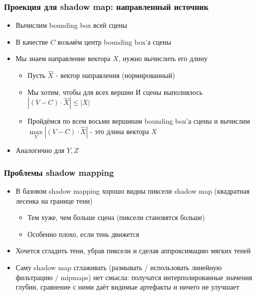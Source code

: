 \documentclass{beamer}
\begin{document}
\begin{frame}[fragile]
\frametitle{Проекция для shadow map: направленный источник}
\begin{itemize}
\item Вычислим bounding box всей сцены
\pause
\item В качестве \begin{math}C\end{math} возьмём центр bounding box'а сцены
\pause
\item Мы знаем направление вектора \begin{math}X\end{math}, нужно вычислить его длину
\begin{itemize}
\item Пусть \begin{math}\hat X\end{math} - вектор направления (нормированный)
\item Мы хотим, чтобы для всех вершин \begin{math}И\end{math} сцены выполнялось \begin{math}|(V - C) \cdot \hat X| \leq |X|\end{math}
\pause
\item Пройдёмся по всем восьми вершинам bounding box'а сцены и вычислим \begin{math}\max\limits_V |(V - C) \cdot \hat X|\end{math} - это длина вектора \begin{math}X\end{math}
\end{itemize}
\pause
\item Аналогично для \begin{math}Y, Z\end{math}
\end{itemize}
\end{frame}

\begin{frame}[fragile]
\frametitle{Проблемы shadow mapping}
\begin{itemize}
\item В базовом shadow mapping хорошо видны пиксели shadow map (квадратная лесенка на границе тени)
\pause
\begin{itemize}
\item Тем хуже, чем больше сцена (пиксели становятся больше)
\item Особенно плохо, если тень движется
\end{itemize}
\pause
\item Хочется сгладить тени, убрав пиксели и сделав аппроксимацию мягких теней
\pause
\item Саму shadow map сглаживать (размывать / использовать линейную фильтрацию / mipmaps) нет смысла: получатся интерполированные значения глубин, сравнение с ними даёт видимые артефакты и ничего не улучшает
\end{itemize}
\end{frame}
\end{document}
